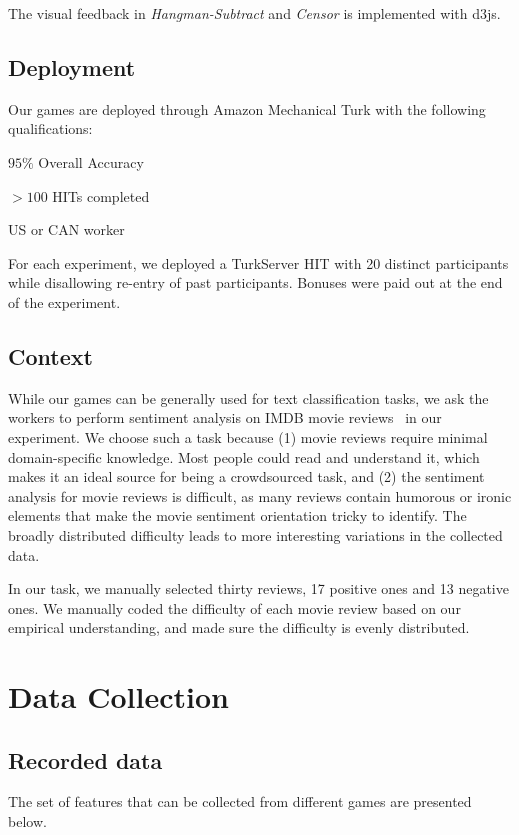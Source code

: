 \documentclass[chi_draft]{sigchi}
\begin{document}
The visual feedback in \emph{Hangman-Subtract} and \emph{Censor} is implemented with d3js.

\subsection{Deployment}
Our games are deployed through Amazon Mechanical Turk with the following qualifications:
\begin{compactitem}
\item $95\%$ Overall Accuracy
\item $> 100$ HITs completed
\item US or CAN worker
\end{compactitem}

For each experiment, we deployed a TurkServer HIT with 20 distinct participants while disallowing  re-entry of past participants. Bonuses were paid out at the end of the experiment. 

\subsection{Context} 
While our games can be generally used for text classification tasks, we ask the workers to perform sentiment analysis on IMDB movie reviews~\cite{alsallakh2014visual} in our experiment. 
We choose such a task because 
(1) movie reviews require minimal domain-specific knowledge. Most people could read and understand it, which makes it an ideal source for being a crowdsourced task, and
(2) the sentiment analysis for movie reviews is difficult, as many reviews contain humorous or ironic elements that make the movie sentiment orientation tricky to identify. The broadly distributed difficulty leads to more interesting variations in the collected data.

In our task, we manually selected thirty reviews, 17 positive ones and 13 negative ones.
We manually coded the difficulty of each movie review based on our empirical understanding, and made sure the difficulty is evenly distributed. 

\section{Data Collection} 
\label{sec:analysis}

\subsection{Recorded data} 
The set of features that can be collected from different games are presented below. 
\end{document}
